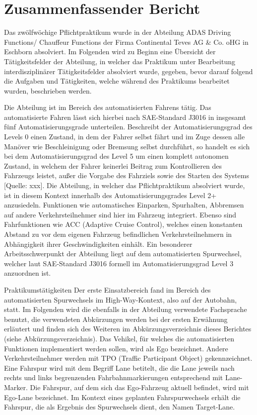 \chapter{Zusammenfassender Bericht}
\label{sec.zusammenfassender_bericht}
Das zwölfwöchige Pflichtpraktikum wurde in der Abteilung ADAS Driving Functions/ Chauffeur Functions der Firma Continental Teves AG \& Co. oHG in Eschborn absolviert. Im Folgenden wird zu Beginn eine Übersicht der Tätigkeitsfelder der Abteilung, in welcher das Praktikum unter Bearbeitung interdisziplinärer Tätigkeitsfelder absolviert wurde, gegeben, bevor darauf folgend die Aufgaben und Tätigkeiten, welche während des Praktikums bearbeitet wurden, beschrieben werden. 

Die Abteilung ist im Bereich des automatisierten Fahrens tätig. Das automatisierte Fahren lässt sich hierbei nach SAE-Standard J3016 in insgesamt fünf Automatisierungsgrade unterteilen. Beschreibt der Automatisierungsgrad des Levels 0 einen Zustand, in dem der Fahrer selbst fährt und im Zuge dessen alle Manöver wie Beschleinigung oder Bremsung selbst durchführt, so handelt es sich bei dem Automatisierungsgrad des Level 5 um einen komplett autonomen Zustand, in welchem der Fahrer keinerlei Beitrag zum Kontrollieren des Fahrzeugs leistet, außer die Vorgabe des Fahrziels sowie des Starten des Systems [Quelle: xxx]. Die Abteilung, in welcher das Pflichtpraktikum absolviert wurde, ist in diesem Kontext innerhalb des Automatisierungsgrades Level 2+ anzusiedeln. Funktionen wie automatisches Einparken, Spurhalten, Abbremsen auf andere Verkehrsteilnehmer sind hier im Fahrzeug integriert. Ebenso sind Fahrfunktionen wie ACC (Adaptive Cruise Control), welches einen konstanten Abstand zu vor dem eigenen Fahrzeug befindlichen Verkehrsteilnehmern in Abhängigkeit ihrer Geschwindigkeiten einhält. Ein besonderer Arbeitsschwerpunkt der Abteilung liegt auf dem automatisierten Spurwechsel, welcher laut SAE-Standard J3016 formell im Automatisierungsgrad Level 3 anzuordnen ist.

Praktikumstätigkeiten
Der erste Einsatzbereich fand im Bereich des automatisierten Spurwechsels im High-Way-Kontext, also auf der Autobahn, statt. Im Folgenden wird die ebenfalls in der Abteilung verwendete Fachsprache benutzt, die verwendeten Abkürzungen werden bei der ersten Erwähnung erläutert und finden sich des Weiteren im Abkürzungsverzeichnis dieses Berichtes (siehe Abkürzungsverzeichnis). Das Vehikel, für welches die automatisierten Funktionen implementiert werden sollen, wird als Ego bezeichnet. Andere Verkehrsteilnehmer werden mit TPO (Traffic Participant Object) gekennzeichnet. Eine Fahrspur wird mit dem Begriff Lane betitelt, die die Lane jeweils nach rechts und links begrenzenden Fahrbahnmarkierungen entsprechend mit Lane-Marker. Die Fahrspur, auf dem sich das Ego-Fahrzeug aktuell befindet, wird mit Ego-Lane bezeichnet. Im Kontext eines geplanten Fahrspurwechsels erhält die Fahrspur, die als Ergebnis des Spurwechsels dient, den Namen Target-Lane.


